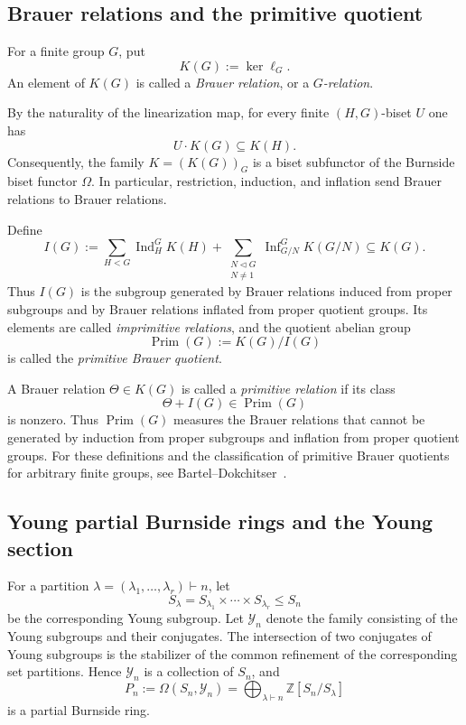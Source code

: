 \documentclass[a4paper,11pt]{article}
\numberwithin{equation}{section}
\newcommand{\Z}{\mathbb{Z}}
\newcommand{\Ind}{\operatorname{Ind}}
\newcommand{\Inf}{\operatorname{Inf}}
\newcommand{\Prim}{\operatorname{Prim}}
\begin{document}
\subsection{Brauer relations and the primitive quotient}
\label{subsec:primitive-prelim}

For a finite group $G$, put
\[
  K(G):=\ker\ell_G.
\]
An element of $K(G)$ is called a \emph{Brauer relation}, or a \emph{$G$-relation}.

By the naturality of the linearization map, for every finite $(H,G)$-biset $U$ one has
\[
  U\cdot K(G)\subseteq K(H).
\]
Consequently, the family $K=(K(G))_G$ is a biset subfunctor of the Burnside biset
functor $\Omega$. In particular, restriction, induction, and inflation send Brauer
relations to Brauer relations.

Define
\begin{equation}\label{eq:imprimitive-lattice-general}
  I(G):=
  \sum_{H<G}\Ind_H^G K(H)
  +
  \sum_{\substack{N\triangleleft G\\N\ne1}}
  \Inf_{G/N}^{G}K(G/N)
  \subseteq K(G).
\end{equation}
Thus $I(G)$ is the subgroup generated by Brauer relations induced from proper
subgroups and by Brauer relations inflated from proper quotient groups. Its elements
are called \emph{imprimitive relations}, and the quotient abelian group
\begin{equation}\label{eq:primitive-quotient-general}
  \Prim(G):=K(G)/I(G)
\end{equation}
is called the \emph{primitive Brauer quotient}.

A Brauer relation $\Theta\in K(G)$ is called a \emph{primitive relation} if its class
\[
  \Theta+I(G)\in\Prim(G)
\]
is nonzero. Thus $\Prim(G)$ measures the Brauer relations that cannot be generated by
induction from proper subgroups and inflation from proper quotient groups. For these
definitions and the classification of primitive Brauer quotients for arbitrary finite
groups, see Bartel--Dokchitser~\cite{BartelDokchitserBrauer}.

\subsection{Young partial Burnside rings and the Young section}
\label{subsec:young-partial}

For a partition $\lambda=(\lambda_1,\ldots,\lambda_r)\vdash n$, let
\[
  S_\lambda=S_{\lambda_1}\times\cdots\times S_{\lambda_r}\le S_n
\]
be the corresponding Young subgroup. Let $\mathcal Y_n$ denote the family consisting
of the Young subgroups and their conjugates. The intersection of two conjugates of
Young subgroups is the stabilizer of the common refinement of the corresponding set
partitions. Hence $\mathcal Y_n$ is a collection of $S_n$, and
\begin{equation}\label{eq:young-partial-ring}
  P_n:=\Omega(S_n,\mathcal Y_n)
  =\bigoplus_{\lambda\vdash n}\Z[S_n/S_\lambda]
\end{equation}
is a partial Burnside ring.
\end{document}
